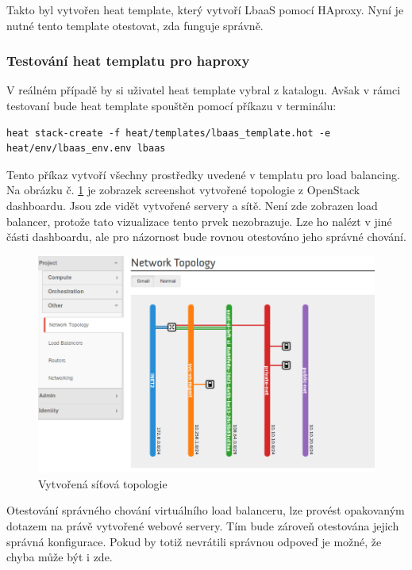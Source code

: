 Takto byl vytvořen heat template, který vytvoří LbaaS pomocí HAproxy. Nyní je nutné tento template otestovat, zda funguje správně.

\subsubsection{Testování heat templatu pro haproxy}

V reálném případě by si uživatel heat template vybral z katalogu. Avšak v rámci testovaní bude heat template spouštěn pomocí příkazu v terminálu:

\begin{lstlisting}
heat stack-create -f heat/templates/lbaas_template.hot -e heat/env/lbaas_env.env lbaas
\end{lstlisting}

Tento příkaz vytvoří všechny prostředky uvedené v templatu pro load balancing. Na obrázku č. \ref{fig:lbaas_topologie} je zobrazek screenshot vytvořené topologie z OpenStack dashboardu. Jsou zde vidět vytvořené servery a sítě. Není zde zobrazen load balancer, protože tato vizualizace tento prvek nezobrazuje. Lze ho nalézt v jiné části dashboardu, ale pro názornost bude rovnou otestováno jeho správné chování.

\begin{figure}[h]
\begin{centering}
\includegraphics[scale=0.45]{images/lbaas_topologie}
\par\end{centering}
\caption{Vytvořená síťová topologie\label{fig:lbaas_topologie}}
\end{figure}

Otestování správného chování virtuálního load balanceru, lze provést opakovaným dotazem na právě vytvořené webové servery. Tím bude zároveň otestována jejich správná konfigurace. Pokud by totiž nevrátili správnou odpoveď je možné, že chyba může být i zde. 

